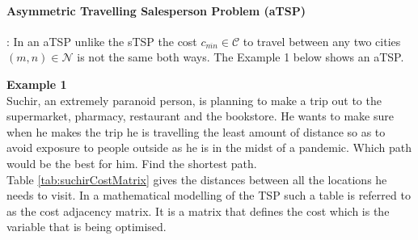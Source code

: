 \documentclass[a4paper]{article}
\begin{document}
\paragraph*{Asymmetric Travelling Salesperson Problem (aTSP)}: In an aTSP  unlike the sTSP the cost $c_{\overline{mn}} \in \mathcal{C}$ to travel between any two cities $(m,n)\in \mathcal{N}$ is not the same both ways. The Example 1 below shows an aTSP.
\begin{displayquote}
    \textbf{Example 1}\\
   Suchir, an extremely paranoid person, is planning to make a trip out to the supermarket, pharmacy, restaurant and the bookstore. He wants to make sure when he makes the trip he is travelling the least amount of distance so as to avoid exposure to people outside as he is in the midst of a pandemic. Which path would be the best for him. Find the shortest path.\\
   Table \ref{tab:suchirCostMatrix} gives the distances between all the locations he needs to visit.  In a mathematical modelling of the TSP such a table is referred to as the cost adjacency matrix.  It is a matrix that defines the cost which is the variable that is being optimised.
 

\end{displayquote}
\end{document}
